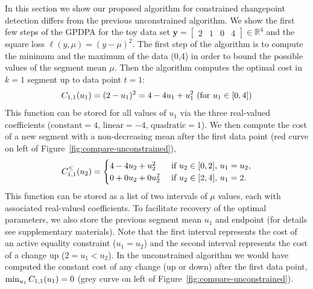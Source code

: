 \documentclass[aoas]{imsart}
\newcommand{\RR}{\mathbb R}
\begin{document}
In this section we show our proposed algorithm for constrained
changepoint detection differs from the previous unconstrained
algorithm. We show the first few steps of the GPDPA for the toy data
set $\mathbf y= \left[
\begin{array}{cccccc}
  2 & 1 & 0 & 4
\end{array}
\right] \in\RR^4$ and the square loss $\ell(y,\mu)=(y-\mu)^2$. The first
step of the algorithm is to compute the minimum and the maximum of the
data (0,4) in order to bound the possible values of the segment
mean $\mu$. Then the algorithm computes the optimal cost in $k=1$ segment up
to data point $t=1$:
\begin{equation}
  \FCC_{1,1}(u_1) = (2-u_1)^2=4 - 4u_1 + u_1^2\text{ (for $u_1\in[0,4]$)}
\end{equation}
This function can be stored for all values of $u_1$ via the three
real-valued coefficients ($\text{constant}=4$, $\text{linear}=-4$,
$\text{quadratic}=1$). We then compute the cost of a new segment with
a non-decreasing mean after the first data point (red curve on left of
Figure~\ref{fig:compare-unconstrained}),
\begin{equation}
  \FCC_{1,1}^\leq(u_2) =
  \begin{cases}
    4 - 4 u_2 + u_2^2 &\text{ if }u_2\in[0,2],\, u_1=u_2,\\
    0 + 0 u_2 + 0 u_2^2 & \text{ if }u_2\in[2,4],\,  u_1=2.
  \end{cases}
\end{equation}
This function can be stored as a list of two intervals of $\mu$
values, each with associated real-valued coefficients. To facilitate
recovery of the optimal parameters, we also store the previous segment
mean $u_1$ and endpoint (for details see supplementary
materials). Note that the first interval represents the cost of an
active equality constraint ($u_1=u_2$) and the second interval
represents the cost of a change up ($2=u_1<u_2$). In the unconstrained
algorithm we would have computed the constant cost of any change (up
or down) after the first data point, $\min_{u_1} C_{1,1}(u_1) =0$
(grey curve on left of Figure~\ref{fig:compare-unconstrained}).
\end{document}
